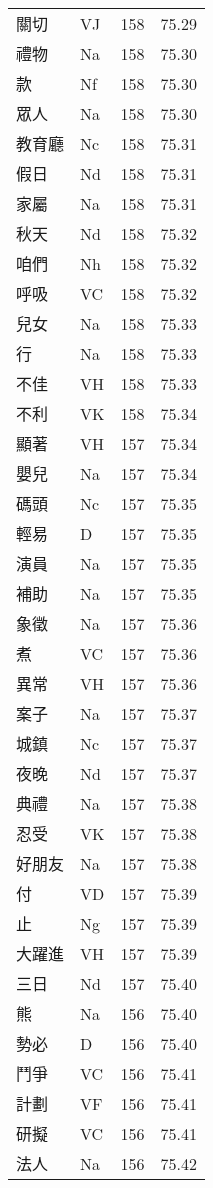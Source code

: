 \documentclass[twocolumn]{book}
\begin{document}
\begin{supertabular}{llrr}
關切 & VJ & 158 &  75.29\\
禮物 & Na & 158 &  75.30\\
款 & Nf & 158 &  75.30\\
眾人 & Na & 158 &  75.30\\
教育廳 & Nc & 158 &  75.31\\
假日 & Nd & 158 &  75.31\\
家屬 & Na & 158 &  75.31\\
秋天 & Nd & 158 &  75.32\\
咱們 & Nh & 158 &  75.32\\
呼吸 & VC & 158 &  75.32\\
兒女 & Na & 158 &  75.33\\
行 & Na & 158 &  75.33\\
不佳 & VH & 158 &  75.33\\
不利 & VK & 158 &  75.34\\
顯著 & VH & 157 &  75.34\\
嬰兒 & Na & 157 &  75.34\\
碼頭 & Nc & 157 &  75.35\\
輕易 & D & 157 &  75.35\\
演員 & Na & 157 &  75.35\\
補助 & Na & 157 &  75.35\\
象徵 & Na & 157 &  75.36\\
煮 & VC & 157 &  75.36\\
異常 & VH & 157 &  75.36\\
案子 & Na & 157 &  75.37\\
城鎮 & Nc & 157 &  75.37\\
夜晚 & Nd & 157 &  75.37\\
典禮 & Na & 157 &  75.38\\
忍受 & VK & 157 &  75.38\\
好朋友 & Na & 157 &  75.38\\
付 & VD & 157 &  75.39\\
止 & Ng & 157 &  75.39\\
大躍進 & VH & 157 &  75.39\\
三日 & Nd & 157 &  75.40\\
熊 & Na & 156 &  75.40\\
勢必 & D & 156 &  75.40\\
鬥爭 & VC & 156 &  75.41\\
計劃 & VF & 156 &  75.41\\
研擬 & VC & 156 &  75.41\\
法人 & Na & 156 &  75.42\\

\end{supertabular}
\end{document}
